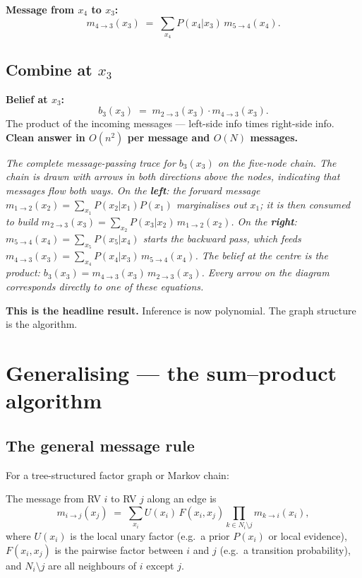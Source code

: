\documentclass[11pt, a4paper]{article}
\begin{document}
\textbf{Message from $x_4$ to $x_3$:}
\[
m_{4\to 3}(x_3) \;=\; \sum_{x_4} P(x_4 | x_3)\,m_{5\to 4}(x_4).
\]

\subsection{Combine at $x_3$}

\textbf{Belief at $x_3$:}
\[
\boxed{\;b_3(x_3) \;=\; m_{2\to 3}(x_3) \cdot m_{4\to 3}(x_3).\;}
\]
The product of the incoming messages --- left-side info times right-side info. \textbf{Clean answer in $O(n^2)$ per message and $O(N)$ messages.}

\begin{center}

\footnotesize\textit{The complete message-passing trace for $b_3(x_3)$ on the five-node chain. The chain is drawn with arrows in both directions above the nodes, indicating that messages flow both ways. On the \textbf{left}: the forward message $m_{1\to 2}(x_2) = \sum_{x_1} P(x_2|x_1)P(x_1)$ marginalises out $x_1$; it is then consumed to build $m_{2\to 3}(x_3) = \sum_{x_2} P(x_3|x_2)\,m_{1\to 2}(x_2)$. On the \textbf{right}: $m_{5\to 4}(x_4) = \sum_{x_5} P(x_5|x_4)$ starts the backward pass, which feeds $m_{4\to 3}(x_3) = \sum_{x_4} P(x_4|x_3)\,m_{5\to 4}(x_4)$. The belief at the centre is the product: $b_3(x_3) = m_{4\to 3}(x_3)\,m_{2\to 3}(x_3)$. Every arrow on the diagram corresponds directly to one of these equations.}
\end{center}

\textbf{This is the headline result.} Inference is now polynomial. The graph structure is the algorithm.

\section{Generalising --- the sum--product algorithm}

\subsection{The general message rule}

For a tree-structured factor graph or Markov chain:

\begin{defbox}
The message from RV $i$ to RV $j$ along an edge is
\[
m_{i\to j}(x_j) \;=\; \sum_{x_i} U(x_i)\,F(x_i, x_j)\prod_{k\in N_i\setminus j} m_{k\to i}(x_i),
\]
where $U(x_i)$ is the local unary factor (e.g.\ a prior $P(x_i)$ or local evidence), $F(x_i, x_j)$ is the pairwise factor between $i$ and $j$ (e.g.\ a transition probability), and $N_i\setminus j$ are all neighbours of $i$ except $j$.
\end{defbox}
\end{document}
